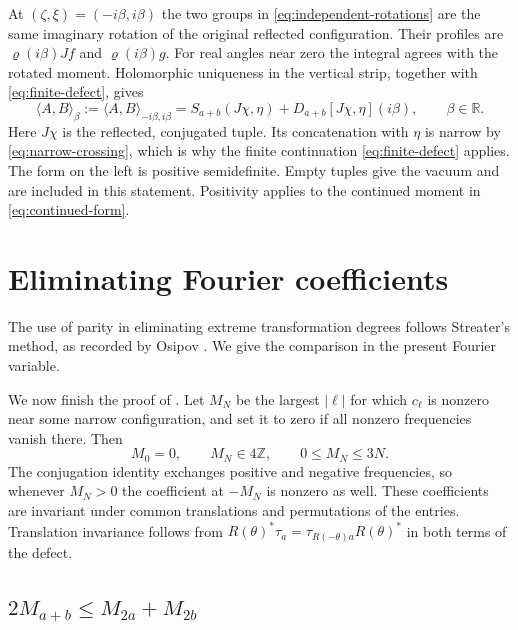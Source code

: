\documentclass[11pt, letterpaper, reqno]{amsart}
\theoremstyle{definition}
\theoremstyle{remark}
\newcommand{\bbR}{\mathbb{R}}
\newcommand{\bbZ}{\mathbb{Z}}
\begin{document}
At $(\zeta,\xi)=(-i\beta,i\beta)$ the two groups in
\eqref{eq:independent-rotations} are the same imaginary rotation of
the original reflected configuration. Their profiles are
$\varrho(i\beta)Jf$ and $\varrho(i\beta)g$. For real angles near zero
the integral agrees with the rotated moment. Holomorphic uniqueness
in the vertical strip, together with \eqref{eq:finite-defect}, gives
\begin{equation}\label{eq:continued-form}
 \langle A,B\rangle_\beta
 :=\langle A,B\rangle_{-i\beta,i\beta}
 =S_{a+b}(J\chi,\eta)+D_{a+b}[J\chi,\eta](i\beta),
 \qquad\beta\in\bbR.
\end{equation}
Here $J\chi$ is the reflected, conjugated tuple. Its concatenation
with $\eta$ is narrow by \eqref{eq:narrow-crossing}, which is why
the finite continuation \eqref{eq:finite-defect} applies.
The form on the left is positive semidefinite. Empty tuples give
the vacuum and are included in this statement. Positivity applies
to the continued moment in \eqref{eq:continued-form}.

\section{Eliminating Fourier coefficients}\label{sec:eliminating}

The use of parity in eliminating extreme transformation degrees follows
Streater's method, as recorded by Osipov \cite{Streater,O}. We give the
comparison in the present Fourier variable.

We now finish the proof of . Let $M_N$ be the largest
$|\ell|$ for which $c_\ell$ is nonzero near some narrow configuration,
and set it to zero if all nonzero frequencies vanish there. Then
\begin{equation}\label{eq:M-bound}
 M_0=0,\qquad M_N\in4\bbZ,\qquad0\leq M_N\leq3N.
\end{equation}
The conjugation identity exchanges positive and negative frequencies,
so whenever $M_N>0$ the coefficient at $-M_N$ is nonzero as well.
These coefficients are invariant under common translations and
permutations of the entries. Translation invariance follows from
$R(\theta)^*\tau_a=\tau_{R(-\theta)a}R(\theta)^*$ in both terms
of the defect.

\subsection{$2M_{a+b}\leq M_{2a}+M_{2b}$}
\end{document}
